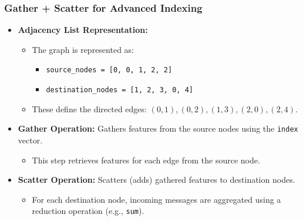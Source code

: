 \begin{notes}
\end{notes}

\subsubsection{Gather + Scatter for Advanced Indexing}
\begin{notes}
    \begin{itemize}    
        \item \textbf{Adjacency List Representation:}
        \begin{itemize}
            \item The graph is represented as:
            \begin{itemize}
                \item \texttt{source\_nodes = [0, 0, 1, 2, 2]}
                \item \texttt{destination\_nodes = [1, 2, 3, 0, 4]}
            \end{itemize}
            \item These define the directed edges: $(0,1), (0,2), (1,3), (2,0), (2,4)$.
        \end{itemize}
        \item \textbf{Gather Operation:} Gathers features from the source nodes using the \texttt{index} vector.
        \begin{itemize}
            \item This step retrieves features for each edge from the source node.
        \end{itemize}
        \item \textbf{Scatter Operation:} Scatters (adds) gathered features to destination nodes.
        \begin{itemize}
            \item For each destination node, incoming messages are aggregated using a reduction operation (e.g., \texttt{sum}).
        \end{itemize}
    \end{itemize}    
\end{notes}
\newpage

